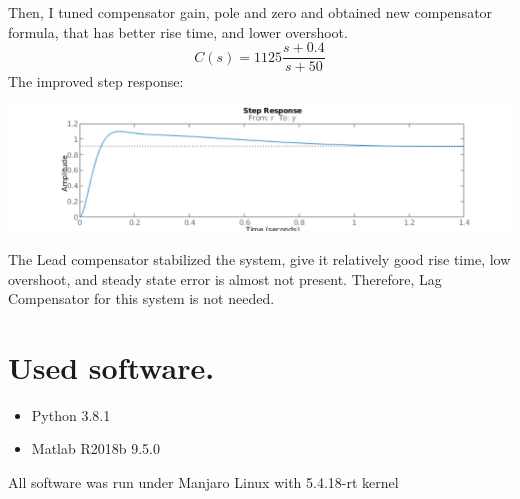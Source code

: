 \documentclass[a4paper,12pt]{article}
\begin{document}
    Then, I tuned compensator gain, pole and zero and obtained new compensator
    formula, that has better rise time, and lower overshoot.
    \begin{equation*}
        C(s) = 1125 \frac{s+0.4}{s+50}
    \end{equation*}
    The improved step response:
    \begin{center}
        \includegraphics[width=\linewidth]{../Task4/LeadTuned.pdf}
    \end{center}
    The Lead compensator stabilized the system, give it relatively good rise time,
    low overshoot, and steady state error is almost not present. Therefore, 
    Lag Compensator for this system is not needed.
 
\section{Used software.}
\begin{itemize}
    \item Python 3.8.1
    \item Matlab R2018b 9.5.0
\end{itemize}
All software was run under Manjaro Linux with 5.4.18-rt kernel
\end{document}
